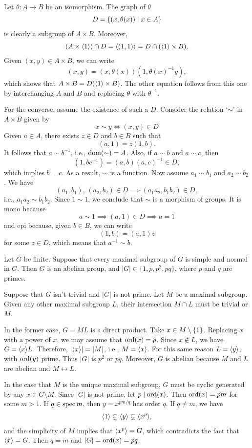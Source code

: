 \begin{solution}
Let $\theta\colon A\to B$ be an isomorphism. The graph of $\theta$
$$
    D = \{(x,\theta(x))\mid x\in A\}
$$
is clearly a subgroup of $A\times B$. Moreover,
$$
    (A\times\langle1\rangle)\cap D=\langle(1,1)\rangle=D\cap(\langle1\rangle\times B).
$$
Given $(x,y)\in A\times B$, we can write
$$
    (x,y) = (x,\theta(x))(1,\theta(x)^{-1}y),
$$
which shows that $A\times B=D(\langle1\rangle\times B)$. The other equation follows from this one by interchanging $A$ and $B$ and replacing $\theta$ with $\theta^{-1}$.

For the converse, assume the existence of such a $D$. Consider the relation `$\sim$' in $A\times B$ given by
$$
    x\sim y \iff (x,y)\in D
$$
Given $a\in A$, there exists $z\in D$ and $b\in B$ such that
$$
    (a,1)=z(1,b).
$$
It follows that $a\sim b^{-1}$, i.e., $\operatorname{dom}(\sim)=A$. Also, if $a\sim b$ and $a\sim c$, then
$$
    (1,bc^{-1})=(a,b)(a,c)^{-1}\in D,
$$
which implies $b=c$. As a result, $\sim$ is a function. Now assume $a_1\sim b_1$ and $a_2\sim b_2$. We have
$$
    (a_1,b_1),\,(a_2,b_2)\in D\implies (a_1a_2,b_1b_2)\in D,
$$
i.e., $a_1a_2\sim b_1b_2$. Since $1\sim1$, we conclude that $\sim$ is a morphism of groups. It is mono because
$$
    a\sim 1\implies (a,1)\in D\implies a=1
$$
and epi because, given $b\in B$, we can write
$$
    (1,b) = (a,1)z
$$
for some $z\in D$, which means that $a^{-1}\sim b$.  \end{solution}

\begin{exr}
    Let\/ $G$ be finite. Suppose that every maximal subgroup of\/ $G$ is simple and normal in\/ $G$. Then\/ $G$ is an abelian group, and\/ $|G| \in \{1, p, p^2, pq\}$, where\/ $p$ and\/ $q$ are primes.
\end{exr}

\begin{solution} Suppose that $G$ isn't trivial and $|G|$ is not prime. Let $M$ be a maximal subgroup. Given any other maximal subgroup $L$, their intersection $M\cap L$ must be trivial or $M$.

In the former case, $G=ML$ is a direct product. Take $x\in M\setminus\{1\}$. Replacing $x$ with a power of $x$, we may assume that ${\rm ord}(x)=p$. Since $x\notin L$, we have $G=\langle x\rangle L$. Therefore, $|\langle x\rangle|=|M|$, i.e., $M=\langle x\rangle$. For this same reason $L=\langle y\rangle$, with ${\rm ord}(y)$ prime. Thus $|G|$ is $p^2$ or $pq$. Moreover, $G$ is abelian because $M$ and $L$ are abelian and $M\leftrightarrow L$.

In the case that $M$ is the unique maximal subgroup, $G$ must be cyclic generated by any $x\in G\setminus M$. Since $|G|$ is not prime, let $p\mid{\rm ord}(x)$. Then ${\rm ord}(x)=pm$ for some $m>1$. If $q\in\operatorname{spec}m$, then $y=x^{pm/q}$ has order $q$. If $q\ne m$, we have
$$
    \langle1\rangle\varsubsetneq\langle y\rangle\varsubsetneq\langle x^p\rangle,
$$
and the simplicity of $M$ implies that $\langle x^p\rangle=G$, which contradicts the fact that $\langle x\rangle=G$. Then $q=m$ and $|G|={\rm ord}(x)=pq$.  \end{solution}


